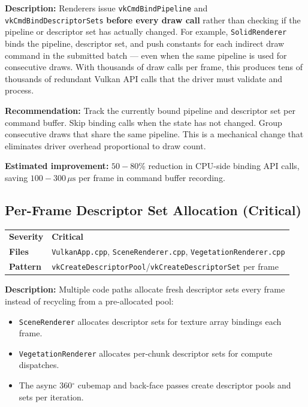 \documentclass[a4paper,10pt]{article}
\newcommand{\us}{\ensuremath{\,\mu\text{s}}}
\newcommand{\degree}{\ensuremath{^\circ}}
\newcommand{\severity}[1]{%
  \ifstrequal{#1}{Critical}{\textcolor{critical}{\textbf{#1}}}{%
  \ifstrequal{#1}{High}{\textcolor{high}{\textbf{#1}}}{%
  \ifstrequal{#1}{Medium}{\textcolor{medium}{\textbf{#1}}}{%
  \ifstrequal{#1}{Low}{\textcolor{low}{\textbf{#1}}}{#1}}}}}
\begin{document}
\vspace{0.5em}
\noindent
\textbf{Description:} Renderers issue \texttt{vkCmdBindPipeline} and
\texttt{vkCmdBindDescriptorSets} \textbf{before every draw call} rather than
checking if the pipeline or descriptor set has actually changed. For example,
\texttt{SolidRenderer} binds the pipeline, descriptor set, and push constants
for each indirect draw command in the submitted batch --- even when the same
pipeline is used for consecutive draws. With thousands of draw calls per frame,
this produces tens of thousands of redundant Vulkan API calls that the driver
must validate and process.

\noindent\textbf{Recommendation:} Track the currently bound pipeline and
descriptor set per command buffer. Skip binding calls when the state has not
changed. Group consecutive draws that share the same pipeline. This is a
mechanical change that eliminates driver overhead proportional to draw count.

\noindent\textbf{Estimated improvement:} $50{-}80\%$ reduction in CPU-side
binding API calls, saving $100{-}300\us$ per frame in command buffer recording.

\subsection{Per-Frame Descriptor Set Allocation (Critical)}

\begin{tabular}{ll}
\textbf{Severity} & \severity{Critical} \\
\textbf{Files}     & \texttt{VulkanApp.cpp}, \texttt{SceneRenderer.cpp},
                      \texttt{VegetationRenderer.cpp} \\
\textbf{Pattern}   & \texttt{vkCreateDescriptorPool}/\texttt{vkCreateDescriptorSet}
                      per frame \\
\end{tabular}

\vspace{0.5em}
\noindent
\textbf{Description:} Multiple code paths allocate fresh descriptor sets every
frame instead of recycling from a pre-allocated pool:

\begin{itemize}[nosep]
    \item \texttt{SceneRenderer} allocates descriptor sets for texture array
          bindings each frame.
    \item \texttt{VegetationRenderer} allocates per-chunk descriptor sets for
          compute dispatches.
    \item The async 360\degree{} cubemap and back-face passes create descriptor
          pools and sets per iteration.
\end{itemize}
\end{document}
